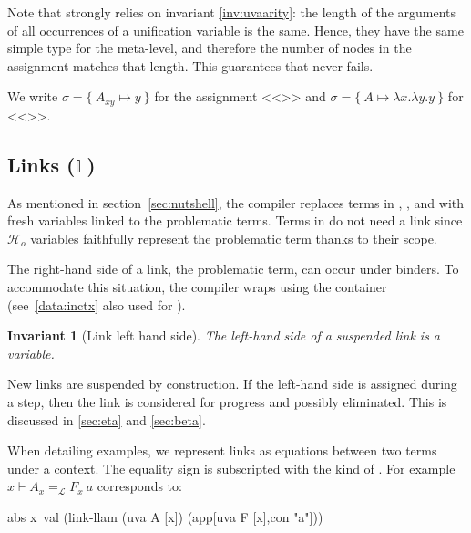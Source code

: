 \documentclass[sigconf,natbib=false,review]{acmart}
\newtheorem{invariant}{Invariant}
\newcommand{\llambda}{\ensuremath{\mathcal{L}}\xspace}
\newcommand{\Ho}{\texorpdfstring{\ensuremath{\mathcal{H}_o}\xspace}{Ho}}
\newcommand{\linkbetaM}[3]{\ensuremath{#1 \vdash #2 =_{\llambda} #3}}
\newcommand{\linkStore}{\texorpdfstring{\ensuremath{\mathbb{L}}\xspace}{L}}
\begin{document}


\noindent
Note that  strongly relies on invariant \ref{inv:uvaarity}: the length
of the arguments of all occurrences of a unification variable is the same. Hence,
they have the same simple type for the meta-level, and therefore the number of
 nodes in the assignment matches that length.
This guarantees that  never fails.



We write $\sigma = \{~ A_{xy} \mapsto y ~\}$ for the assignment
<<>> and $\sigma = \{~ A \mapsto \lambda x.\lambda y.y ~\}$
for <<>>.

\subsection{Links (\linkStore)}

\noindent
As mentioned in section~\ref{sec:nutshell}, the compiler
replaces terms in \maybeeta, \maybebeta, and \notllambda with fresh
variables linked to the problematic terms. Terms in \maybebeta do not
need a link since \Ho{} variables faithfully represent
the problematic term thanks to their scope.



\noindent
The right-hand side of a link, the problematic term, can occur under binders.
To accommodate this situation, the compiler wraps  using
the  container (see~\ref{data:inctx} also used for ).

\begin{invariant}[Link left hand side]\label{inv:linklhs}
  The left-hand side of a suspended link
  is a variable.
\end{invariant}

\noindent
New links are suspended by construction.
If the left-hand side is assigned during a step, then 
the link is considered for progress and possibly eliminated.
This is discussed in \cref{sec:eta} and \cref{sec:beta}.

When detailing examples, we represent links as equations between two
terms under a context.
The equality sign is subscripted with the
kind of . For example $\linkbetaM{x}{A_x}{F_x~a}$ corresponds to:
\begin{elpicode}
abs x\ val (link-llam (uva A [x]) (app[uva F [x],con "a"]))
\end{elpicode}
\end{document}
